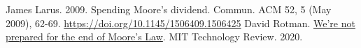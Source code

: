 \documentclass [12pt]{article}
\begin{document}

 
        



\begin{thebibliography}{1}
    James Larus. 2009. Spending Moore's dividend. Commun. ACM 52, 5 (May 2009), 62-69. \url{https://doi.org/10.1145/1506409.1506425}
    David Rotman. \href{https://www.technologyreview.com/2020/02/24/905789/were-not-prepared-for-the-end-of-moores-law/}{We're not prepared for the end of Moore's Law}. MIT Technology Review. 2020. 
\end{thebibliography}
\end{document}
